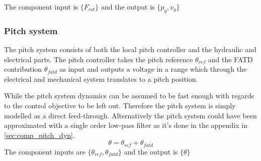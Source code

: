 The component input is $ \{F_{rot} \} $ and the output is $ \{p_y, v_y\} $


\subsubsection{Pitch system} \label{sec:comp_pitch}
The pitch system consists of both the local pitch controller and the hydraulic and electrical parts. The pitch controller takes the pitch reference $ \theta_{ref} $ and the FATD contribution $ \theta_{fatd} $ as input and outputs a voltage in a range which through the electrical and mechanical system translates to a pitch position. 

While the pitch system dynamics can be assumed to be fast enough with regards to the control objective to be left out. Therefore the pitch system is simply modelled as a direct feed-through. Alternatively the pitch system could have been approximated with a single order low-pass filter as it's done in the appendix in \cref{sec:comp_pitch_dyn}. 
\begin{equation}\label{eq:comp_pitch_freq}
	\theta = \theta_{ref} + \theta_{fatd}
\end{equation}
The component inputs are $ \{\theta_{ref}, \theta_{fatd}  \} $ and the output is $ \{\theta \} $


